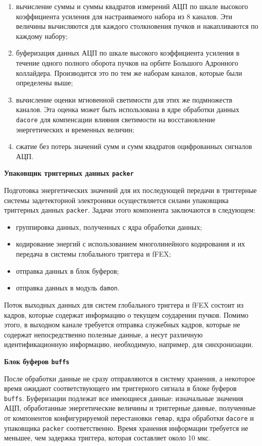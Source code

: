 \begin{enumerate}
    \item вычисление суммы и суммы квадратов измерений АЦП по шкале высокого коэффициента усиления для настраиваемого набора из 8 каналов. Эти величины вычисляются для каждого столкновения пучков и накапливаются по каждому набору;
    \item буферизация данных АЦП по шкале высокого коэффициента усиления в течение одного полного оборота пучков на орбите Большого Адронного коллайдера. Производится это по тем же наборам каналов, которые были определены выше;
    \item вычисление оценки мгновенной светимости для этих же подмножеств каналов. Эта оценка может быть использована в ядре обработки данных \texttt{dacore} для компенсации влияния светимости на восстановление энергетических и временных величин;
    \item сжатие без потерь значений сумм и сумм квадратов оцифрованных сигналов АЦП.
\end{enumerate}\par
\textbf{Упаковщик триггерных данных \texttt{packer}}\par
Подготовка энергетических значений для их последующей передачи в триггерные системы задетекторной электроники осуществляется силами упаковщика триггерных данных \texttt{packer}. Задачи этого компонента заключаются в следующем:\par
\begin{itemize}
    \item группировка данных, полученных с ядра обработки данных;
    \item кодирование энергий с использованием многолинейного кодирования и их передача в системы глобального триггера и fFEX;
    \item отправка данных в блок буферов;
    \item отправка данных в модуль \texttt{damon}.
\end{itemize}\par
Поток выходных данных для систем глобального триггера и fFEX состоит из кадров, которые содержат информацию о текущем соударении пучков. Помимо этого, в выходном канале требуется отправка служебных кадров, которые не содержат непосредственно полезные данные, а несут различную идентификационную информацию, необходимую, например, для синхронизации.\par
\textbf{Блок буферов \texttt{buffs}}\par
После обработки данные не сразу отправляются в систему хранения, а некоторое время ожидают соответствующего им триггерного сигнала в блоке буферов \texttt{buffs}. Буферизации подлежат все имеющиеся данные: изначальные значения АЦП, обработанные энергетические величины и триггерные данные, полученные от компонентов конфигурируемой перестановки \texttt{remap}, ядра обработки \texttt{dacore} и упаковщика \texttt{packer} соответственно. Время хранения информации требуется не меньшее, чем задержка триггера, которая составляет около 10 мкс.\par
